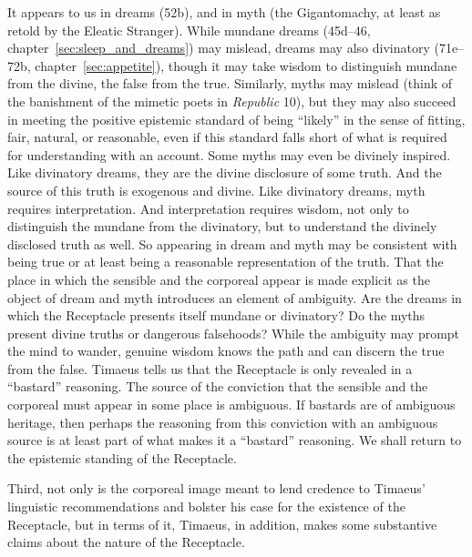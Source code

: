 It appears to us in dreams (52b), and in myth (the Gigantomachy, at least as retold by the Eleatic Stranger). While mundane dreams (45d--46, chapter~\ref{sec:sleep_and_dreams}) may mislead, dreams may also divinatory (71e--72b, chapter~\ref{sec:appetite}), though it may take wisdom to distinguish mundane from the divine, the false from the true. Similarly, myths may mislead (think of the banishment of the mimetic poets in \emph{Republic} 10), but they may also succeed in meeting the positive epistemic standard of being ``likely'' in the sense of fitting, fair, natural, or reasonable, even if this standard falls short of what is required for understanding with an account. Some myths may even be divinely inspired. Like divinatory dreams, they are the divine disclosure of some truth. And the source of this truth is exogenous and divine. Like divinatory dreams, myth requires interpretation. And interpretation requires wisdom, not only to distinguish the mundane from the divinatory, but to understand the divinely disclosed truth as well. So appearing in dream and myth may be consistent with being true or at least being a reasonable representation of the truth. That the place in which the sensible and the corporeal appear is made explicit as the object of dream and myth introduces an element of ambiguity. Are the dreams in which the Receptacle presents itself mundane or divinatory? Do the myths present divine truths or dangerous falsehoods? While the ambiguity may prompt the mind to wander, genuine wisdom knows the path and can discern the true from the false. Timaeus tells us that the Receptacle is only revealed in a ``bastard'' reasoning. The source of the conviction that the sensible and the corporeal must appear in some place is ambiguous. If bastards are of ambiguous heritage, then perhaps the reasoning from this conviction with an ambiguous source is at least part of what makes it a ``bastard'' reasoning. We shall return to the epistemic standing of the Receptacle.

Third, not only is the corporeal image meant to lend credence to Timaeus' linguistic recommendations and bolster his case for the existence of the Receptacle, but in terms of it, Timaeus, in addition, makes some substantive claims about the nature of the Receptacle. 


